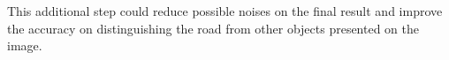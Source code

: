 

This additional step could reduce possible noises on the final result and improve the accuracy on distinguishing the road from other objects presented on the image.


